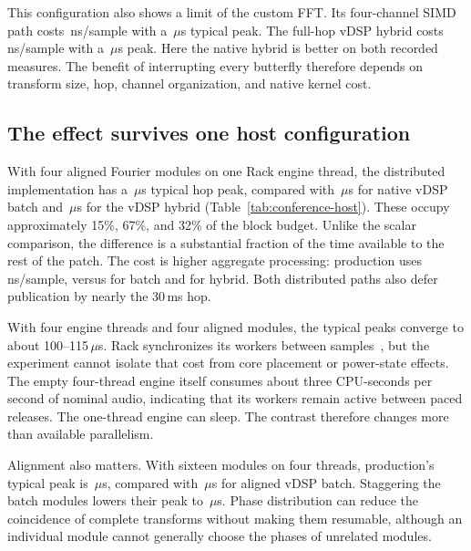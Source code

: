 

This configuration also shows a limit of the custom FFT. Its four-channel SIMD
path costs \StudySimdExtremeCost\,ns/sample with a
\StudySimdExtremePeak\,$\mu$s typical peak. The full-hop vDSP hybrid
costs \StudyHorizonFullCost\,ns/sample with a
\StudyHorizonFullPeak\,$\mu$s peak. Here the native hybrid is better on
both recorded measures. The benefit of interrupting every butterfly therefore
depends on transform size, hop, channel organization, and native kernel cost.

\subsection{The effect survives one host configuration}
With four aligned Fourier modules on one Rack engine thread, the distributed
implementation has a \StudyHostCorePeak\,$\mu$s typical hop peak,
compared with \StudyHostBatchPeak\,$\mu$s for native vDSP batch and
\StudyHostHybridPeak\,$\mu$s for the vDSP hybrid
(Table~\ref{tab:conference-host}). These occupy approximately 15\%, 67\%,
and 32\% of the block budget. Unlike the scalar comparison, the difference
is a substantial fraction of the time available to the rest of the patch.
The cost is higher aggregate processing: production uses
\StudyHostCoreCost\,ns/sample, versus \StudyHostBatchCost{} for batch and
\StudyHostHybridCost{} for hybrid. Both distributed paths also defer
publication by nearly the 30\,ms hop.



With four engine threads and four aligned modules, the typical peaks converge
to about 100--115\,$\mu$s. Rack synchronizes its workers between
samples~\cite{rackengine}, but the experiment cannot isolate that cost from
core placement or power-state effects. The empty four-thread engine itself
consumes about three CPU-seconds per second of nominal audio, indicating that
its workers remain active between paced releases. The one-thread engine can
sleep. The contrast therefore changes more than available parallelism.

Alignment also matters. With sixteen modules on four threads, production's
typical peak is \StudyHostManyCorePeak\,$\mu$s, compared with
\StudyHostManyBatchPeak\,$\mu$s for aligned vDSP batch. Staggering the
batch modules lowers their peak to
\StudyHostStaggerBatchPeak\,$\mu$s. Phase distribution can reduce the
coincidence of complete transforms without making them resumable, although an
individual module cannot generally choose the phases of unrelated modules.

